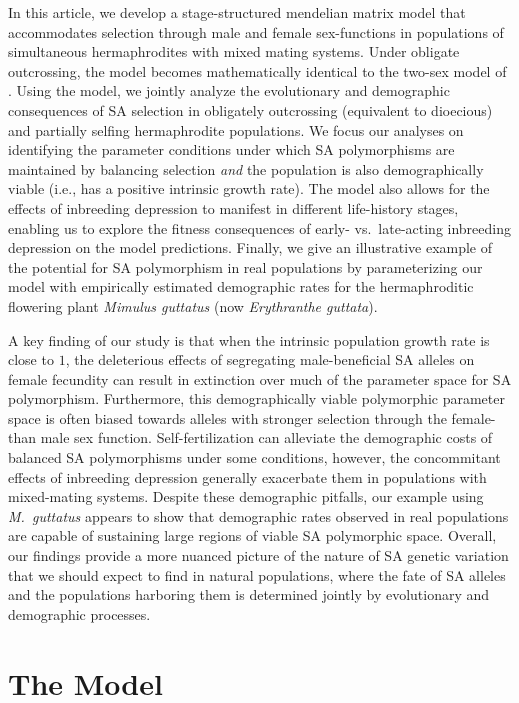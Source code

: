 \documentclass[11pt]{article}
\begin{document}
In this article, we develop a stage-structured mendelian matrix model that accommodates selection through male and female sex-functions in populations of simultaneous hermaphrodites with mixed mating systems. Under obligate outcrossing, the model becomes mathematically identical to the two-sex model of \citet{deVriesCaswell2019b}. Using the model, we jointly analyze the evolutionary and demographic consequences of SA selection in obligately outcrossing (equivalent to dioecious) and partially selfing hermaphrodite populations. We focus our analyses on identifying the parameter conditions under which SA polymorphisms are maintained by balancing selection {\itshape and} the population is also demographically viable (i.e., has a positive intrinsic growth rate). The model also allows for the effects of inbreeding depression to manifest in different life-history stages, enabling us to explore the fitness consequences of early- vs.~late-acting inbreeding depression on the model predictions. Finally, we give an illustrative example of the potential for SA polymorphism in real populations by parameterizing our model with empirically estimated demographic rates for the hermaphroditic flowering plant {\itshape Mimulus guttatus} (now {\itshape Erythranthe guttata}).

A key finding of our study is that when the intrinsic population growth rate is close to $1$, the deleterious effects of segregating male-beneficial SA alleles on female fecundity can result in extinction over much of the parameter space for SA polymorphism. Furthermore, this demographically viable polymorphic parameter space is often biased towards alleles with stronger selection through the female- than male sex function. Self-fertilization can alleviate the demographic costs of balanced SA polymorphisms under some conditions, however, the concommitant effects of inbreeding depression generally exacerbate them in populations with mixed-mating systems. Despite these demographic pitfalls, our example using {\itshape M.~guttatus} appears to show that demographic rates observed in real populations are capable of sustaining large regions of viable SA polymorphic space. Overall, our findings provide a more nuanced picture of the nature of SA genetic variation that we should expect to find in natural populations, where the fate of SA alleles and the populations harboring them is determined jointly by evolutionary and demographic processes.


\section*{The Model}
\end{document}
